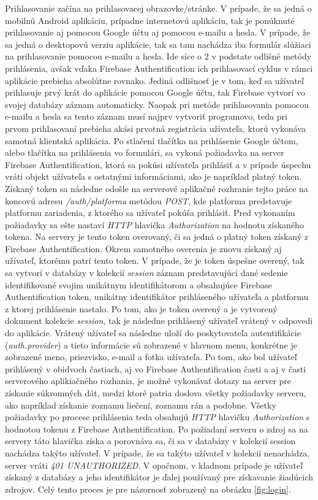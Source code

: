 Prihlasovanie začína na prihlasovacej obrazovke/stránke. V prípade, že sa jedná o mobilnú Android aplikáciu, prípadne internetovú aplikáciu, tak je ponúknuté prihlasovanie aj pomocou Google účtu aj pomocou e-mailu a hesla. V prípade, že sa jedná o desktopovú verziu aplikácie, tak sa tam nachádza iba formulár slúžiaci na prihlasovanie pomocou e-mailu a hesla. Ide síce o 2 v podstate odlišné metódy prihlásenia, avšak vďaka Firebase Authentification ich prihlasovací cyklus v rámci aplikácie prebieha absolútne rovnako. Jediná odlišnosť je v tom, keď sa užívateľ prihlasuje prvý krát do aplikácie pomocou Google účtu, tak Firebase vytvorí vo svojej databázy záznam automaticky. Naopak pri metóde prihlasovania pomocou e-mailu a hesla sa tento záznam musí najprv vytvoriť programovo, teda pri prvom prihlasovaní prebieha akási prvotná registrácia užívateľa, ktorú vykonáva samotná klientská aplikácia. Po stlačení tlačítka na prihlásenie Google účtom, alebo tlačítka na prihlásenia vo formulári, sa vykoná požiadavka na server Firebase Authentification, ktorá sa pokúsi užívateľa prihlásiť a v prípade úspechu vráti objekt užívateľa s ostatnými informáciami, ako je napríklad platný token. Získaný token sa následne odošle na serverové aplikačné rozhranie tejto práce na koncovú adresu \textit{/auth/platforma} metódou \textit{POST}, kde platforma predstavuje platformu zariadenia, z ktorého sa užívateľ pokúša prihlásiť. Pred vykonaním požiadavky sa ešte nastaví \textit{HTTP} hlavička \textit{Authorization} na hodnotu získaného tokena. Na servery je tento token overovaný, či sa jedná o platný token získaný z Firebase Authentification. Okrem samotného overenia je znovu získaný aj užívateľ, ktorému patrí tento token. V prípade, že je token úspešne overený, tak sa vytvorí v databázy v kolekcií \textit{session} záznam predstavujúci dané sedenie identifikované svojim unikátnym identifikátorom a obsahujúce Firebase Authentification token, unikátny identifikátor prihláseného užívateľa a platformu z ktorej prihlásenie nastalo. Po tom, ako je token overený a je vytvorený dokument kolekcie \textit{session}, tak je následne prihlásený užívateľ vrátený v odpovedi do aplikácie. Vrátený užívateľ sa následne uloží do poskytovateľa autentifikácie (\textit{auth.provider}) a tieto informácie sú zobrazené v hlavnom menu, konkrétne je zobrazené meno, priezvisko, e-mail a fotka užívateľa. Po tom, ako bol užívateľ prihlásený v obidvoch častiach, aj vo Firebase Authentification časti a aj v časti serverového aplikiačného rozhania, je možné vykonávať dotazy na server pre získanie súkromných dát, medzi ktoré patria doslova všetky požiadavky serveru, ako napríklad získanie zoznamu liečení, zoznamu rán a podobne. Všetky požiadavky po procese prihlásenia teda obsahujú \textit{HTTP} hlavičku \textit{Authorization} s hodnotou tokenu z Firebase Authentification. Po požiadaní serveru o zdroj sa na servery táto hlavička získa a porovnáva sa, či sa v databázy v kolekcií session nachádza takýto užívateľ. V prípade, že sa takýto užívateľ v kolekcií nenachádza, server vráti \textit{401 UNAUTHORIZED}. V opačnom, v kladnom prípade je užívateľ získaný z databázy a jeho identifikátor je ďalej používaný pre získavanie žiadúcich zdrojov. Celý tento proces je pre názornosť zobrazený na obrázku \ref{fig:login}. 
